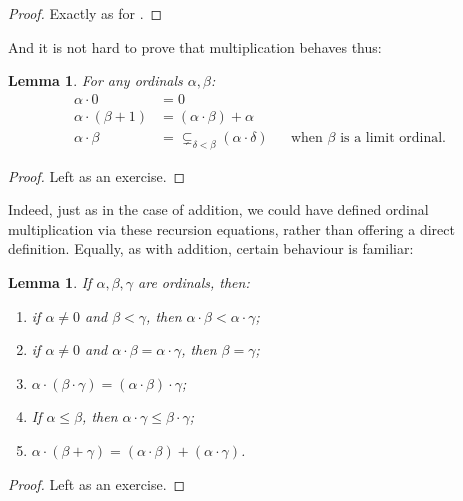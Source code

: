 \documentclass[10pt,a4paper]{article}
\makeatletter
\theoremstyle{plain}
\newtheorem{lem}[thm]{Lemma}
\theoremstyle{definition}
\theoremstyle{remark}
\newcommand*{\ollabel}[1]{\label{#1}}
\newcommand{\olref}{\@ifnextchar[{\olref@i}{\olref@final}}
\def\olref@i[#1]{\@ifnextchar[{\olref@ii}{\olref@final}}
\def\olref@ii[#1]{\@ifnextchar[{\olref@iii}{\olref@final}}
\def\olref@iii[#1]{\olref@final}
\def\olref@final#1{\ref{#1}}
\providecommand{\ordtimes}{\mathbin{\cdot}}
\providecommand{\ordplus}{\mathbin{+}}
\providecommand{\supstrict}{\subsetneq}
\makeatother
\begin{document}
\begin{proof}
Exactly as for \olref[add]{ordsumlessiswo}.
\end{proof}
\noindent
And it is not hard to prove that multiplication behaves thus:

\begin{lem}\ollabel{ordtimesrecursion}
For any ordinals $\alpha, \beta$:
\begin{align*}
	\alpha \ordtimes 0 &= 0\\
	\alpha \ordtimes (\beta \ordplus 1) &= 
		(\alpha \ordtimes \beta) \ordplus \alpha\\
	\alpha  \ordtimes \beta &= 
		\supstrict_{\delta < \beta}(\alpha \ordtimes \delta) && 
		\text{when $\beta$ is a limit ordinal}.
\end{align*}
\end{lem}

\begin{proof}
Left as an exercise.
\end{proof}

Indeed, just as in the case of addition, we could have defined ordinal
multiplication via these recursion equations, rather than offering a
direct definition. Equally, as with addition, certain behaviour is
familiar:

\begin{lem}\ollabel{ordinalmultiplicationisnice}
If $\alpha, \beta, \gamma$ are ordinals, then:
\begin{enumerate}
	\item\ollabel{ordtimes1} if $\alpha \neq 0$ and $\beta < \gamma$,
	then $\alpha \ordtimes \beta < \alpha \ordtimes \gamma$;
	\item\ollabel{ordtimes2} if $\alpha \neq 0$ and $\alpha \ordtimes
	\beta = \alpha\ordtimes\gamma$, then $\beta = \gamma$;
	\item\ollabel{ordtimes3}  $\alpha \ordtimes (\beta \ordtimes
	\gamma) = (\alpha \ordtimes \beta) \ordtimes \gamma$;
	\item\ollabel{ordtimes4}  If $\alpha \leq \beta$, then $\alpha
	\ordtimes \gamma \leq \beta \ordtimes \gamma$;
	\item\ollabel{ordtimes5}  $\alpha \ordtimes (\beta \ordplus
	\gamma) = (\alpha \ordtimes \beta )\ordplus (\alpha\ordtimes
	\gamma)$.
\end{enumerate}
\end{lem}

\begin{proof}
Left as an exercise.
\end{proof}
\end{document}
